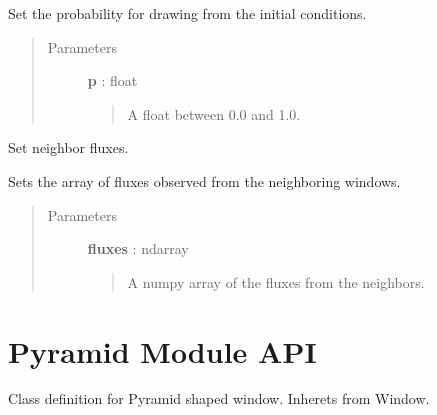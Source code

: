 \documentclass[letterpaper,10pt,english]{sphinxmanual}
\begin{document}
\begin{fulllineitems}
\begin{fulllineitems}
\begin{quote}
\begin{description}
\end{description}\end{quote}

\end{fulllineitems}


\begin{fulllineitems}
\label{neus/neus.doc:neus.window.Window.set_initial_conditions_probability}
Set the probability for drawing from the initial conditions.
\begin{quote}\begin{description}
\item[{Parameters}] \leavevmode
\textbf{p} : float
\begin{quote}

A float between 0.0 and 1.0.
\end{quote}

\end{description}\end{quote}

\end{fulllineitems}


\begin{fulllineitems}
\label{neus/neus.doc:neus.window.Window.update_fluxes}
Set neighbor fluxes.

Sets the array of fluxes observed from the neighboring windows.
\begin{quote}\begin{description}
\item[{Parameters}] \leavevmode
\textbf{fluxes} : ndarray
\begin{quote}

A numpy array of the fluxes from the neighbors.
\end{quote}

\end{description}\end{quote}

\end{fulllineitems}


\end{fulllineitems}



\section{Pyramid Module API}
\label{neus/neus.doc:module-neus.pyramid}\label{neus/neus.doc:pyramid-module-api}
Class definition for Pyramid shaped window. Inherets from Window.
\end{document}
